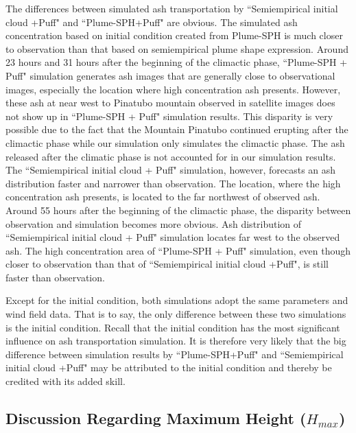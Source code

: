 \documentclass[draft,linenumbers]{agujournal2019}
\begin{document}
The differences between simulated ash transportation by ``Semiempirical initial cloud +Puff" and ``Plume-SPH+Puff" are obvious. The simulated ash concentration based on initial condition created from Plume-SPH is much closer to observation than that based on semiempirical plume shape expression. Around 23 hours and 31 hours after the beginning of the climactic phase, ``Plume-SPH + Puff" simulation generates ash images that are generally close to observational images, especially the location where high concentration ash presents. However, these ash at near west to Pinatubo mountain observed in satellite images does not show up in ``Plume-SPH + Puff" simulation results. This disparity is very possible due to the fact that the Mountain Pinatubo continued erupting after the climactic phase while our simulation only simulates the climactic phase. The ash released after the climatic phase is not accounted for in our simulation results. The ``Semiempirical initial cloud + Puff" simulation, however, forecasts an ash distribution faster and narrower than observation. The location, where the high concentration ash presents, is located to the far northwest of observed ash.
Around 55 hours after the beginning of the climactic phase, the disparity between observation and simulation becomes more obvious. Ash distribution of ``Semiempirical initial cloud + Puff" simulation locates far west to the observed ash. The high concentration area of ``Plume-SPH + Puff" simulation, even though closer to observation than that of ``Semiempirical initial cloud +Puff", is still faster than observation.

Except for the initial condition, both simulations adopt the same parameters and wind field data. That is to say, the only difference between these two simulations is the initial condition. Recall that the initial condition has the most significant influence on ash transportation simulation. It is therefore very likely that the big difference between simulation results by ``Plume-SPH+Puff" and ``Semiempirical initial cloud +Puff" may be attributed to the initial condition and thereby be credited with its added skill.%

\subsection{Discussion Regarding Maximum Height ($H_{max}$)}
\end{document}
